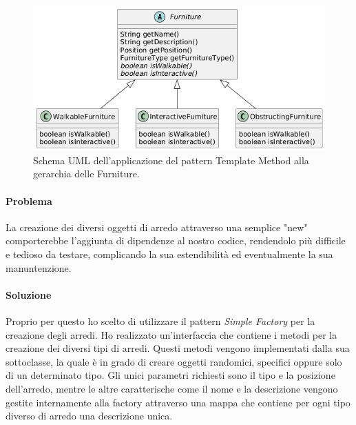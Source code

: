 \documentclass[a4paper,12pt]{report}
\begin{document}
\begin{figure}[H]
	\centering{}
	\includegraphics[width=\textwidth]{img/template.png}
	\caption{Schema UML dell'applicazione del pattern Template Method alla gerarchia delle Furniture.}
	\label{img:template}
\end{figure}

\paragraph{Problema} La creazione dei diversi oggetti di arredo attraverso una semplice "new" comporterebbe
l'aggiunta di dipendenze al nostro codice, rendendolo più difficile e tedioso da testare, 
complicando la sua estendibilità ed eventualmente la sua manuntenzione. 
\paragraph{Soluzione} Proprio per questo ho scelto di utilizzare il pattern \textit{Simple Factory} per la 
creazione degli arredi. Ho realizzato un'interfaccia che contiene i metodi per la creazione dei diversi
tipi di arredi. Questi metodi vengono implementati dalla sua sottoclasse, la quale è in grado di creare 
oggetti randomici, specifici oppure solo di un determinato tipo. Gli unici parametri richiesti sono il tipo
e la posizione dell'arredo, mentre le altre caratterische come il nome e la descrizione vengono gestite
internamente alla factory attraverso una mappa che contiene per ogni tipo diverso di arredo una descrizione unica.
\end{document}
